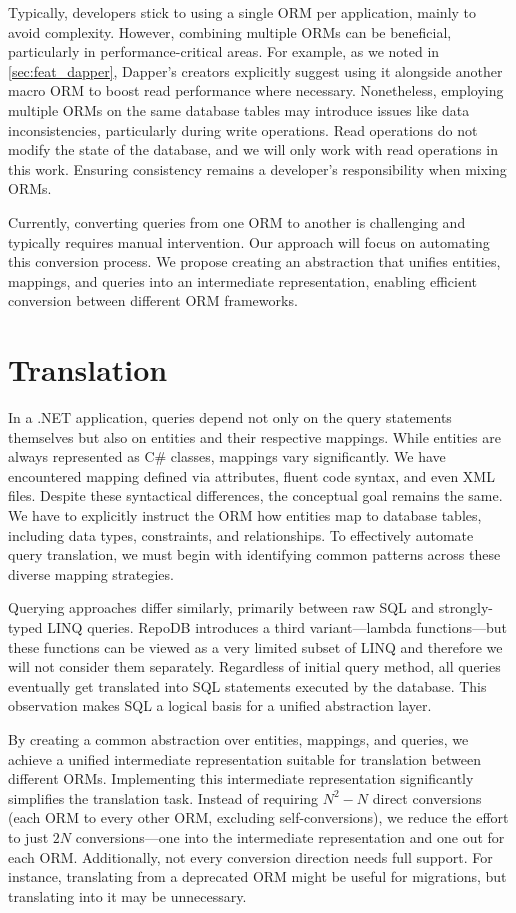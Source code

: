 Typically, developers stick to using a single ORM per application, mainly to avoid complexity. However, combining multiple ORMs can be beneficial, particularly in performance-critical areas. For example, as we noted in \autoref{sec:feat_dapper}, Dapper's creators explicitly suggest using it alongside another macro ORM to boost read performance where necessary. Nonetheless, employing multiple ORMs on the same database tables may introduce issues like data inconsistencies, particularly during write operations. Read operations do not modify the state of the database, and we will only work with read operations in this work. Ensuring consistency remains a developer's responsibility when mixing ORMs.

Currently, converting queries from one ORM to another is challenging and typically requires manual intervention. Our approach will focus on automating this conversion process. We propose creating an abstraction that unifies entities, mappings, and queries into an intermediate representation, enabling efficient conversion between different ORM frameworks.

\section{Translation}

In a .NET application, queries depend not only on the query statements themselves but also on entities and their respective mappings. While entities are always represented as C\# classes, mappings vary significantly. We have encountered mapping defined via attributes, fluent code syntax, and even XML files. Despite these syntactical differences, the conceptual goal remains the same. We have to explicitly instruct the ORM how entities map to database tables, including data types, constraints, and relationships. To effectively automate query translation, we must begin with identifying common patterns across these diverse mapping strategies.

Querying approaches differ similarly, primarily between raw SQL and strongly-typed LINQ queries. RepoDB introduces a third variant---lambda functions---but these functions can be viewed as a very limited subset of LINQ and therefore we will not consider them separately. Regardless of initial query method, all queries eventually get translated into SQL statements executed by the database. This observation makes SQL a logical basis for a unified abstraction layer.

By creating a common abstraction over entities, mappings, and queries, we achieve a unified intermediate representation suitable for translation between different ORMs. Implementing this intermediate representation significantly simplifies the translation task. Instead of requiring $N^2 - N$ direct conversions (each ORM to every other ORM, excluding self-conversions), we reduce the effort to just $2N$ conversions---one into the intermediate representation and one out for each ORM. Additionally, not every conversion direction needs full support. For instance, translating from a deprecated ORM might be useful for migrations, but translating into it may be unnecessary.

